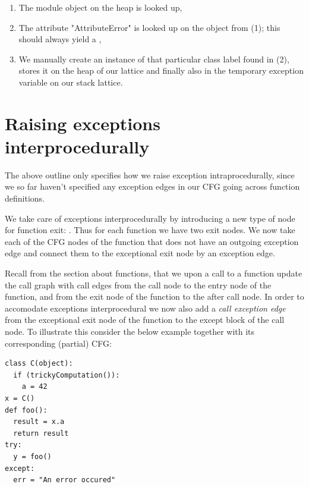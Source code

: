 \begin{enumerate}
	\item The  module object on the heap is looked up,
	\item The attribute "AttributeError" is looked up on the  object from (1); this should always yield a ,
	\item We manually create an instance of that particular class label found in (2), stores it on the heap of our lattice and finally also in the temporary exception variable on our stack lattice.
\end{enumerate}


\section{Raising exceptions interprocedurally}
The above outline only specifies how we raise exception intraprocedurally, since we so far haven't specified any exception edges in our CFG going across function definitions.

We take care of exceptions interprocedurally by introducing a new type of node for function exit: . Thus for each function we have two exit nodes. We now take each of the CFG nodes of the function that does not have an outgoing exception edge and connect them to the exceptional exit node by an exception edge.

Recall from the section about functions, that we upon a call to a function update the call graph with call edges from the call node to the entry node of the function, and from the exit node of the function to the after call node. In order to accomodate exceptions interprocedural we now also add a \textit{call exception edge} from the exceptional exit node of the function to the except block of the call node. To illustrate this consider the below example together with its corresponding (partial) CFG:

\begin{listing}[H]
	\begin{verbatim}
class C(object):
  if (trickyComputation()):
    a = 42
x = C()
def foo():
  result = x.a
  return result
try:
  y = foo()
except:
  err = "An error occured"
	\end{verbatim}
\end{listing}

